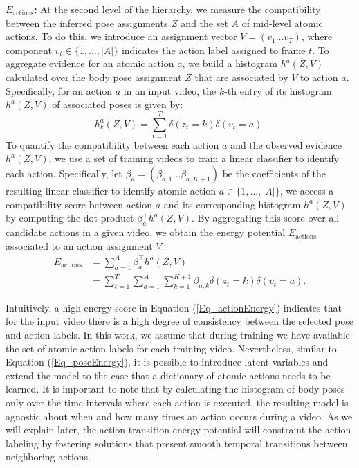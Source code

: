 \noindent \textbf{$E_{\text{actions}}$:} At the second level of the hierarchy, we measure the 
compatibility between
the inferred pose assignments $Z$ and the set $A$ of mid-level atomic actions. To do this, we 
introduce an assignment vector $V= (v_1 \dots v_T)$,
where component $v_t \in \{1,\dots,|A|\}$  indicates the action label assigned to frame $t$. To 
aggregate evidence for an atomic action $a$,
we build a histogram $h^a(Z,V)$ calculated over the body pose assignment $Z$ that are associated by 
$V$ to action $a$. Specifically, for an action $a$ in an input video, the $k$-th entry of its 
histogram $h^a(Z, V)$ of associated poses is given by:
\begin{equation} \label{Eq_actionsHisto}
h_k^a(Z, V) = \sum_{t=1}^T \delta(z_t = k) \delta(v_t = a).
\end{equation}
To quantify the compatibility between each
action $a$ and the observed evidence $h^a(Z,V)$, we use a set of training videos to train a linear
classifier to identify each action. Specifically, let $\beta_a=(\beta_{a,1} \dots \beta_{a,K+1})$ 
be the coefficients of the resulting linear classifier to identify atomic action $a \in \{1, 
\ldots, |A|\}$, we access a compatibility score between action $a$ and its corresponding
histogram $h^a(Z,V)$ by computing the
dot product $\beta_a^\top h^a(Z, V)$. By aggregating this score over all candidate actions in a 
given video, we
obtain the energy potential $E_{\text{actions}}$ associated to an action assignment $V$:
\begin{equation}
\begin{split}
 \label{Eq_actionEnergy}
E_{\text{actions}} & =  \sum_{a=1}^A \beta_{a}^\top h^a(Z, V)   \\
& =  \sum_{t=1}^T \sum_{a=1}^A \sum_{k=1}^{K+1}  \beta_{a,k} \delta(z_t = k) \delta(v_t = a).
\end{split}
\end{equation}

Intuitively, a high energy score in Equation (\ref{Eq_actionEnergy}) indicates that for the input 
video there is a high degree of 
consistency between the selected pose and action labels. In this work, we assume that during 
training we 
have available the set of atomic action labels for each training video. Nevertheless,
similar to Equation (\ref{Eq_poseEnergy}), it is possible to introduce
latent variables and extend the model to the case that a dictionary of atomic actions needs to be 
learned. It is important to note that by calculating the histogram of body poses only over the time 
intervals where each action is executed, the resulting model is agnostic
about when and how many times an action occurs during a video. As we will explain later, the action 
transition energy potential will constraint the action labeling by fostering solutions that 
present smooth temporal transitions between neighboring actions. 

